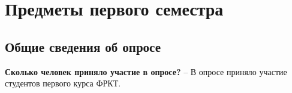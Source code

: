 \section{Предметы первого семестра}

    \subsection{Общие сведения об опросе}

    \textbf{Сколько человек приняло участие в опросе?} -- В опросе приняло участие  студентов первого курса ФРКТ.

    
    
    
    
    
    